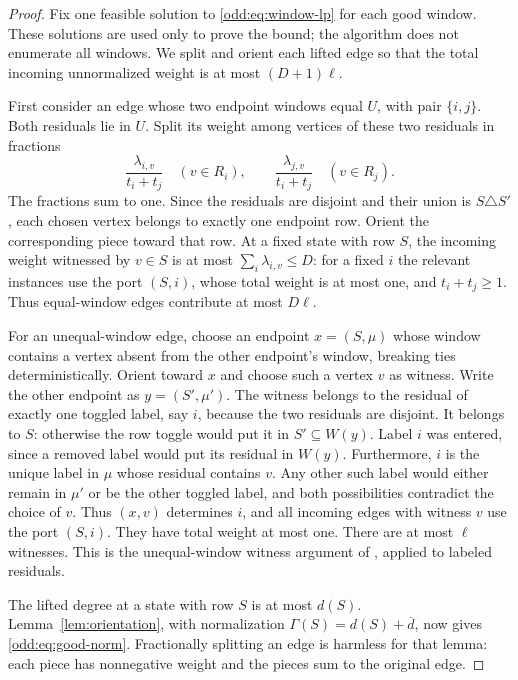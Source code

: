 \documentclass[letterpaper,11pt]{article}
\theoremstyle{definition}
\begin{document}
\begin{proof}
Fix one feasible solution to \eqref{odd:eq:window-lp} for each good
window.  These solutions are used only to prove the bound; the algorithm
does not enumerate all windows.  We split and orient each lifted edge
so that the total incoming unnormalized weight is at most $(D+1)\ell$.

First consider an edge whose two endpoint windows equal $U$, with pair
$\{i,j\}$.  Both residuals lie in $U$.  Split its weight among vertices
of these two residuals in fractions
\[
 \frac{\lambda_{i,v}}{t_i+t_j}\quad(v\in R_i),\qquad
 \frac{\lambda_{j,v}}{t_i+t_j}\quad(v\in R_j).
\]
The fractions sum to one.  Since the residuals are disjoint and their
union is $S\triangle S'$, each chosen vertex belongs to exactly one
endpoint row.  Orient the corresponding piece toward that row.
At a fixed state with row $S$, the incoming weight witnessed by $v\in S$
is at most $\sum_i\lambda_{i,v}\leq D$: for a fixed $i$ the relevant
instances use the port $(S,i)$, whose total weight is at most one, and
$t_i+t_j\geq1$.  Thus equal-window edges contribute at most $D\ell$.

For an unequal-window edge, choose an endpoint $x=(S,\mu)$ whose window
contains a vertex absent from the other endpoint's window, breaking ties
deterministically.  Orient toward $x$ and choose such a vertex $v$ as
witness.  Write the other endpoint as $y=(S',\mu')$.  The witness belongs
to the residual of exactly one toggled label, say $i$, because the two
residuals are disjoint.  It belongs to $S$: otherwise the row toggle
would put it in $S'\subseteq W(y)$.  Label $i$ was entered, since a
removed label would put its residual in $W(y)$.  Furthermore, $i$ is the
unique label in $\mu$ whose residual contains $v$.  Any other such label
would either remain in $\mu'$ or be the other toggled label, and both
possibilities contradict the choice of $v$.  Thus $(x,v)$ determines
$i$, and all incoming edges with witness $v$ use the port $(S,i)$.
They have total weight at most one.  There are at most $\ell$ witnesses.
This is the unequal-window witness argument of
\cite[Section~3.3]{SH26Moore}, applied to labeled residuals.

The lifted degree at a state with row $S$ is at most $d(S)$.
Lemma~\ref{lem:orientation}, with normalization
$\Gamma(S)=d(S)+\overline d$, now gives
\eqref{odd:eq:good-norm}.  Fractionally splitting an edge is harmless for
that lemma: each piece has nonnegative weight and the pieces sum to the
original edge.
\end{proof}
\end{document}
